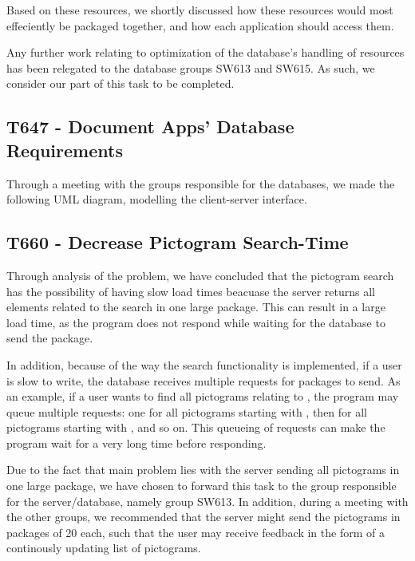 Based on these resources, we shortly discussed how these resources would most
effeciently be packaged together, and how each application should access
them.\nl

Any further work relating to optimization of the database's handling of
resources has been relegated to the database groups SW613 and SW615. As such, we
consider our part of this task to be completed.

\subsection{T647 - Document Apps' Database Requirements}
Through a meeting with the groups responsible for the databases, we made the
following UML diagram, modelling the client-server interface.


\subsection{T660 - Decrease Pictogram Search-Time}
Through analysis of the problem, we have concluded that the pictogram search has
the possibility of having slow load times beacuase the server returns all
elements related to the search in one large package. This can result in a large
load time, as the program does not respond while waiting for the database to
send the package. \nl

In addition, because of the way the search functionality is
implemented, if a user is slow to write, the database receives multiple requests
for packages to send. As an example, if a user wants to find all pictograms
relating to , the program may queue multiple requests: one for
all pictograms starting with , then for all pictograms starting with
, and so on. This queueing of requests can make the program wait for a
very long time before responding.\nl

Due to the fact that main problem lies with the server sending all pictograms in
one large package, we have chosen to forward this task to the group responsible
for the server/database, namely group SW613. In addition, during a meeting with
the other groups, we recommended that the server might send the pictograms in
packages of 20 each, such that the user may receive feedback in the form of a
continously updating list of pictograms.

